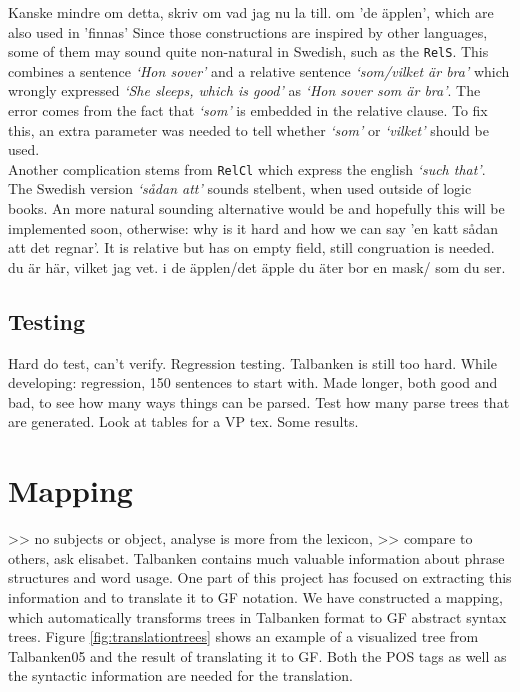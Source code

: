 \documentclass{report}
\begin{document}
Kanske mindre om detta, skriv om vad jag nu la till.
om 'de äpplen', which are also used in 'finnas'
Since those constructions are inspired by other languages, some of them may sound quite
non-natural in Swedish, such as the \verb|RelS|. This combines a sentence \emph{`Hon sover'}
and a relative sentence \emph{`som/vilket är bra'} which wrongly expressed 
\emph{`She sleeps, which is good'} as
\emph{`Hon sover som är bra'}. The error comes from the fact that \emph{`som'} is
embedded in the relative clause. To fix this, an extra parameter was needed to tell whether
\emph{`som'} or \emph{`vilket'} should be used. \\
Another complication stems from \verb|RelCl| which express the english \emph{`such that'}.
The Swedish version \emph{`sådan att'} sounds stelbent, when used outside of logic books.
An more natural sounding alternative would be
and hopefully this will be implemented soon, otherwise: why is it hard and how we can say
'en katt sådan att det regnar'. It is relative but has on empty field, still congruation is
needed.
du är här, vilket jag vet.
i de äpplen/det äpple du äter bor en mask/ som du ser.\\


\subsection{Testing}
Hard do test, can't verify. Regression testing. Talbanken is still too hard.
While developing: regression, 150 sentences to start with. Made longer, both good and bad,
to see how many ways things can be parsed.
Test how many parse trees that are generated.
Look at tables for a VP tex.
Some results.


\section{Mapping}
>> no subjects or object, analyse is more from the lexicon,
>> compare to others, ask elisabet.
\label{sec:Mapping}
Talbanken contains much valuable information about phrase structures and word 
usage. One part of this project has focused on extracting this information
and to translate it to GF notation. We have constructed a mapping, which 
automatically transforms trees in Talbanken format to GF abstract syntax trees.
Figure \ref{fig:translationtrees} shows an example of a visualized tree
from Talbanken05 and the result of translating it to GF.
Both the POS tags as well as the syntactic information are needed for the translation.
\end{document}
